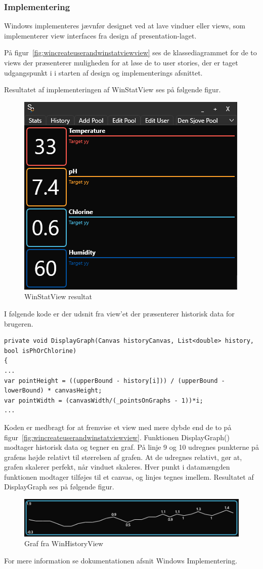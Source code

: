 \subsubsection{Implementering}
Windows implementeres jævnfør designet ved at lave vinduer eller views, som implementerer view interfaces fra design af presentation-laget.

På figur~\ref{fig:wincreateuserandwinstatviewview} ses de klassediagrammet for de to views der præsenterer muligheden for at løse de to user stories, der er taget udgangspunkt i i starten af design og implementerings afsnittet.

Resultatet af implementeringen af WinStatView ses på følgende figur.

\begin{figure}
\centering
\includegraphics[width=0.5\linewidth]{figs/implementering/winstatview}
\caption{WinStatView resultat}
\label{fig:winstatview}
\end{figure}

I følgende kode er der udsnit fra view'et der præsenterer historisk data for brugeren. 

\begin{lstlisting}[caption=DisplayGraph, label=DisplayGraph]
private void DisplayGraph(Canvas historyCanvas, List<double> history, bool isPhOrChlorine)
{
...
var pointHeight = ((upperBound - history[i])) / (upperBound - lowerBound) * canvasHeight;
var pointWidth = (canvasWidth/(_pointsOnGraphs - 1))*i;
...
\end{lstlisting}

Koden er medbragt for at fremvise et view med mere dybde end de to på figur~\ref{fig:wincreateuserandwinstatviewview}.
Funktionen DisplayGraph() modtager historisk data og tegner en graf. 
På linje 9 og 10 udregnes punkterne på grafens højde relativt til størrelsen af grafen. At de udregnes relativt, gør at, grafen skalerer perfekt, når vinduet skaleres. 
Hver punkt i datamængden funktionen modtager tilføjes til et canvas, og linjes tegnes imellem.
Resultatet af DisplayGraph ses på følgende figur.

\begin{figure}
\centering
\includegraphics[width=0.4\linewidth]{figs/implementering/displaygraph}
\caption{Graf fra WinHistoryView}
\label{fig:displaygraph}
\end{figure}

For mere information se dokumentationen afsnit Windows Implementering.